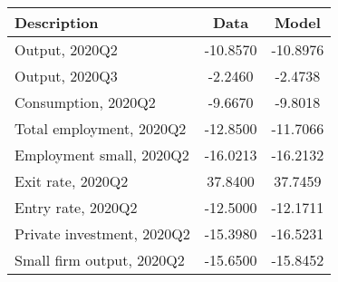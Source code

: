  \begin{tabular}{lcc} \hline \hline 
 Description & Data & Model      \\ 
 \hline 
Output, 2020Q2            & -10.8570 & -10.8976   \\ 
Output, 2020Q3            &  -2.2460 &  -2.4738   \\ 
Consumption, 2020Q2        &  -9.6670 &  -9.8018   \\ 
Total employment, 2020Q2     & -12.8500 & -11.7066   \\ 
Employment small, 2020Q2      & -16.0213 & -16.2132   \\ 
Exit rate, 2020Q2       &  37.8400 &  37.7459   \\ 
Entry rate, 2020Q2       & -12.5000 & -12.1711   \\ 
Private investment, 2020Q2         & -15.3980 & -16.5231   \\ 
Small firm output, 2020Q2 & -15.6500 & -15.8452   \\ 
\hline \hline 
 \end{tabular} 
